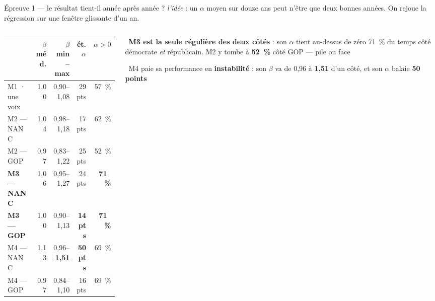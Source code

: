 \documentclass[11pt,aspectratio=169]{beamer}
\newcommand{\obs}[1]{{\color{bleu}\scriptsize\textbullet}~{\scriptsize #1}\par\vspace{0.4mm}}
\newcommand{\lire}[1]{{\scriptsize\color{grisf}#1}}
\begin{document}
\begin{frame}{Épreuve 1 --- le résultat tient-il année après année ?}
  \lire{\emph{l'idée} : un $\alpha$ moyen sur douze ans peut n'être que deux bonnes années. On
   rejoue la régression sur une fenêtre glissante d'un an.}
  \par\vspace{3mm}
  \begin{columns}[T]
    \begin{column}{0.46\textwidth}
      {\scriptsize\setlength{\tabcolsep}{4pt}\setlength{\extrarowheight}{1pt}
      \begin{tabular}{@{}l r r r r@{}}
        \toprule
        & $\beta$ méd. & $\beta$ min--max & ét. $\alpha$ & $\alpha > 0$\\
        \midrule
        M1 · une voix & 1,00 & 0,90--1,08 & 29 pts & 57~\%\\
        \midrule
        M2 --- NANC & 1,04 & 0,98--1,18 & 17 pts & 62~\%\\
        M2 --- GOP & 0,97 & 0,83--1,22 & 25 pts & 52~\%\\
        \midrule
        \textbf{M3 --- NANC} & 1,06 & 0,95--1,27 & 24 pts & \textbf{71~\%}\\
        \textbf{M3 --- GOP} & 1,00 & 0,90--1,13 & \textbf{14 pts} & \textbf{71~\%}\\
        \midrule
        M4 --- NANC & 1,13 & 0,96--\textbf{1,51} & \textbf{50 pts} & 69~\%\\
        M4 --- GOP & 0,97 & 0,84--1,10 & 16 pts & 69~\%\\
        \bottomrule
      \end{tabular}}
    \end{column}
    \begin{column}{0.52\textwidth}
      \obs{\textbf{M3 est la seule régulière des deux côtés} : son $\alpha$ tient au-dessus de
       zéro 71~\% du temps côté démocrate \emph{et} républicain. M2 y tombe à \textbf{52~\%} côté
       GOP --- pile ou face}
      \vspace{2mm}
      \obs{M4 paie sa performance en \textbf{instabilité} : son $\beta$ va de 0,96 à \textbf{1,51}
       d'un côté, et son $\alpha$ balaie \textbf{50 points}}
    \end{column}
  \end{columns}
\end{frame}
\end{document}
